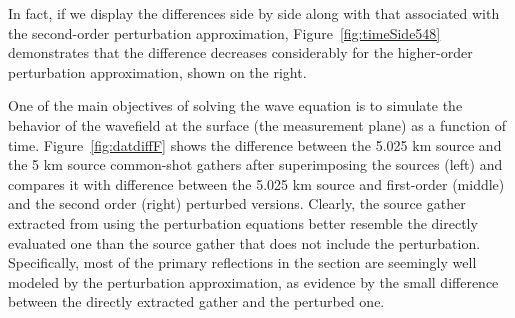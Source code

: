 In fact, if we display the differences side by side along with that associated with the second-order perturbation approximation, Figure~\ref{fig:timeSide548} demonstrates
that the difference decreases considerably for the higher-order perturbation approximation, shown on the right.

One of the main objectives of solving the wave equation is to simulate the behavior of the wavefield at the surface 
(the measurement plane) as a function of time. Figure~\ref{fig:datdiffF} shows the difference between the 5.025 km source and the 5 km source common-shot gathers
after superimposing the sources  (left) and compares
it with difference between the 5.025 km source and first-order (middle) and the second order (right) perturbed versions. Clearly, the
source gather extracted from using the perturbation equations better resemble the directly evaluated one than the source gather that does not include the perturbation. Specifically, most of the primary reflections in the section are seemingly well modeled by the perturbation approximation,
as evidence by the small difference between the directly extracted gather and the perturbed one.

